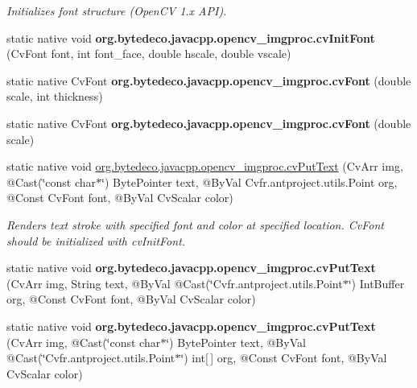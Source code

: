 \begin{DoxyCompactItemize}
\begin{DoxyCompactList}\small\item\em Initializes font structure (Open\+CV 1.\+x A\+PI). \end{DoxyCompactList}\item 
\mbox{\label{group__imgproc__c_gae01e24a910194852d21c1a06f6d8da57}} 
static native void {\bfseries org.\+bytedeco.\+javacpp.\+opencv\+\_\+imgproc.\+cv\+Init\+Font} (Cv\+Font font, int font\+\_\+face, double hscale, double vscale)
\item 
\mbox{\label{group__imgproc__c_gabd35098d26d989c413244e42f2df56cb}} 
static native Cv\+Font {\bfseries org.\+bytedeco.\+javacpp.\+opencv\+\_\+imgproc.\+cv\+Font} (double scale, int thickness)
\item 
\mbox{\label{group__imgproc__c_gaeb467c98164d58ffcfc4b90334e5ab81}} 
static native Cv\+Font {\bfseries org.\+bytedeco.\+javacpp.\+opencv\+\_\+imgproc.\+cv\+Font} (double scale)
\item 
static native void \hyperlink{group__imgproc__c_gaa0527c4e076b98ec48324b7585ca98df}{org.\+bytedeco.\+javacpp.\+opencv\+\_\+imgproc.\+cv\+Put\+Text} (Cv\+Arr img, @Cast(\char`\"{}const char$\ast$\char`\"{}) Byte\+Pointer text, @By\+Val Cv\+fr.antproject.utils.Point org, @Const Cv\+Font font, @By\+Val Cv\+Scalar color)
\begin{DoxyCompactList}\small\item\em Renders text stroke with specified font and color at specified location. Cv\+Font should be initialized with cv\+Init\+Font. \end{DoxyCompactList}\item 
\mbox{\label{group__imgproc__c_ga01518e816a1247f37c0658259b598581}} 
static native void {\bfseries org.\+bytedeco.\+javacpp.\+opencv\+\_\+imgproc.\+cv\+Put\+Text} (Cv\+Arr img, String text, @By\+Val @Cast(\char`\"{}Cv\+fr.antproject.utils.Point$\ast$\char`\"{}) Int\+Buffer org, @Const Cv\+Font font, @By\+Val Cv\+Scalar color)
\item 
\mbox{\label{group__imgproc__c_gafaa7fe81e5fc8188cec75426b231f629}} 
static native void {\bfseries org.\+bytedeco.\+javacpp.\+opencv\+\_\+imgproc.\+cv\+Put\+Text} (Cv\+Arr img, @Cast(\char`\"{}const char$\ast$\char`\"{}) Byte\+Pointer text, @By\+Val @Cast(\char`\"{}Cv\+fr.antproject.utils.Point$\ast$\char`\"{}) int\mbox{[}$\,$\mbox{]} org, @Const Cv\+Font font, @By\+Val Cv\+Scalar color)

\end{DoxyCompactItemize}
